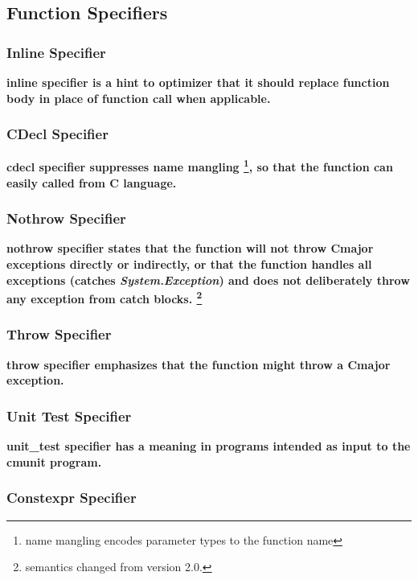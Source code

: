 \documentclass[a4paper,oneside,11pt]{article}
\begin{document}
\subsection{Function Specifiers}

\subsubsection{Inline Specifier}

\bf{inline} specifier is a hint to optimizer that
it should replace function body in place of function call when applicable.

\subsubsection{CDecl Specifier}

\bf{cdecl} specifier suppresses name mangling \footnote{name mangling encodes parameter types to the function name},
so that the function can easily called from C language.

\subsubsection{Nothrow Specifier}

\bf{nothrow} specifier states that the function will not throw Cmajor exceptions directly or indirectly,
or that the function handles all exceptions (catches \emph{System.Exception})
and does not deliberately throw any exception from catch blocks. \footnote{semantics changed from version 2.0.}

\subsubsection{Throw Specifier}

\bf{throw} specifier emphasizes that the function might throw a Cmajor exception.

\subsubsection{Unit Test Specifier}

\bf{unit\_test} specifier has a meaning in programs intended as input to the \bf{cmunit} program.

\subsubsection{Constexpr Specifier}\label{constexprfun}
\end{document}

